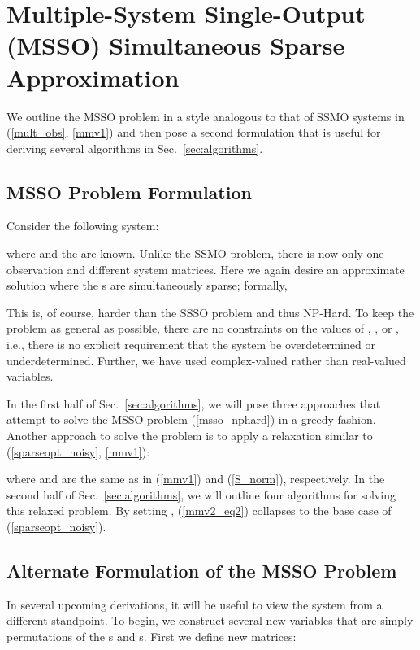 \documentclass[final]{siamltex}
\newcommand{\la}[1]{\mbox{}}  \newcommand{\sst}[1]{\mbox{\scriptsize{#1}}}
\begin{document}
\section{Multiple-System Single-Output (MSSO) Simultaneous Sparse Approximation}
\label{sec:problem}

   We outline the MSSO problem in a style analogous to that of SSMO
   systems in (\ref{mult_obs}, \ref{mmv1}) and then pose a second
   formulation that is useful for deriving several algorithms in
   Sec.~\ref{sec:algorithms}.

\subsection{MSSO Problem Formulation}

   Consider the following system:
   
   where  and the  are known.  Unlike the SSMO problem, there is now only one
   observation and  different system matrices.  Here we again 
   desire an approximate solution where the s are simultaneously sparse;
   formally,
   
   This is, of course, harder than the SSSO problem and thus NP-Hard.
   To keep
   the problem as general as possible, there are no constraints
   on the values of , , or , i.e., there is no explicit requirement
   that the system be overdetermined or underdetermined.  Further,
   we have used complex-valued rather than real-valued variables.

   In the first half of Sec.~\ref{sec:algorithms}, we will pose three
   approaches that attempt to solve the MSSO problem
   (\ref{msso_nphard}) in a greedy fashion.  Another approach to solve
   the problem is to apply a relaxation similar to
   (\ref{sparseopt_noisy}, \ref{mmv1}):
   
   where \la{G} and  are
   the same as in (\ref{mmv1}) and (\ref{S_norm}), respectively. In
   the second half of Sec.~\ref{sec:algorithms}, we will outline four
   algorithms for solving this relaxed problem.  By setting ,
   (\ref{mmv2_eq2}) collapses to the base case of
   (\ref{sparseopt_noisy}).

\subsection{Alternate Formulation of the MSSO Problem}

   In several upcoming derivations, it will be useful to view the system
   from a different standpoint.  To begin, we construct several new variables
   that are simply permutations of the s and s.
   First we define  new matrices:
   
\end{document}

